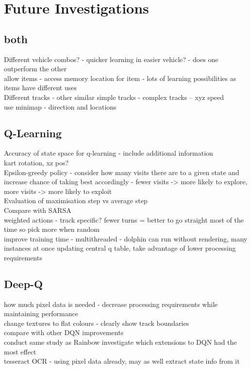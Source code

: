 
\chapter{Future Investigations}
\section{both}
Different vehicle combos? - quicker learning in easier vehicle? - does one outperform the other
\\ allow items - access memory location for item - lots of learning possibilities as items have different uses
\\Different tracks - other similar simple tracks - complex tracks -- xyz speed
\\ use minimap - direction and locations

\section{Q-Learning}
Accuracy of state space for q-learning - include additional information\\
kart rotation, xz pos?
\\ Epsilon-greedy policy - consider how many visits there are to a given state and increase chance of taking best accordingly - fewer visits -> more likely to explore, more visits -> more likely to exploit
\\ Evaluation of maximisation step vs average step
\\ Compare with SARSA
\\ weighted actions - track specific? fewer turns = better to go straight most of the time so pick more when random
\\ improve training time - multithreaded - dolphin can run without rendering, many instances at once updating central q table, take advantage of lower processing requirements

\section{Deep-Q}
how much pixel data is needed - decrease processing requirements while maintaining performance
\\ change textures to flat colours - clearly show track boundaries
\\ compare with other DQN improvements
\\ conduct same study as Rainbow \cite{hessel2018rainbow} investigate which extensions to DQN had the most effect
\\ tesseract OCR - using pixel data already, may as well extract state info from it